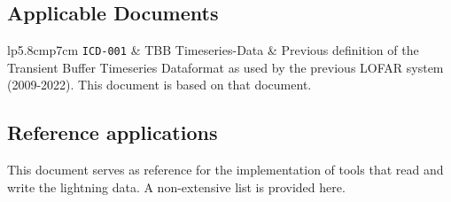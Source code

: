 \documentclass[a4paper,10pt,bibtotoc]{scrartcl}
\begin{document}




\subsection{Applicable Documents}




\begin{center}
  \tablelasttail{\hline}
  \begin{supertabular}{lp{5.8cm}p{7cm}}
    \shrinkheight{-4.5em}
    \texttt{ICD-001} \cite{lofar.icd.001} & TBB Timeseries-Data & Previous definition of the Transient Buffer Timeseries Dataformat as used by the previous LOFAR system (2009-2022). This document is based on that document. \\
    \hline
  \end{supertabular}
\end{center}


\subsection{Reference applications}
This document serves as reference for the implementation of tools that read and write the lightning data. A non-extensive list is provided here.

\end{document}
